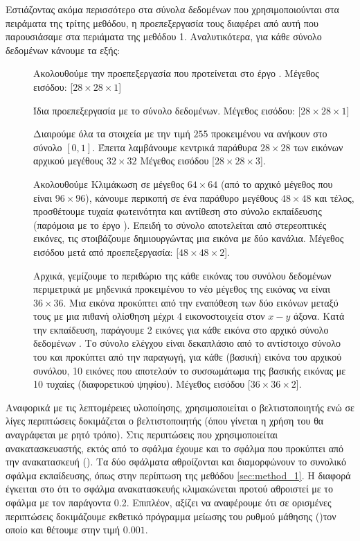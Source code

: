 Εστιάζοντας ακόμα περισσότερο στα σύνολα δεδομένων που χρησιμοποιούνται στα πειράματα της τρίτης μεθόδου, η προεπεξεργασία τους διαφέρει από αυτή που παρουσιάσαμε στα περιάματα της μεθόδου 1. Αναλυτικότερα, για κάθε σύνολο δεδομένων κάνουμε τα εξής:
\begin{description}
    \item[] Ακολουθούμε την προεπεξεργασία που προτείνεται στο έργο \cite{byerly2020branching}. Μέγεθος εισόδου: [$28 \times 28 \times 1$]
    \item[] Ίδια προεπεξεργασία με το σύνολο δεδομένων. Μέγεθος εισόδου: [$28 \times 28 \times 1$]
    \item[] Διαιρούμε όλα τα στοιχεία με την τιμή $255$ προκειμένου να ανήκουν στο σύνολο $[0,1]$. Έπειτα λαμβάνουμε κεντρικά παράθυρα $28 \times 28$ των εικόνων αρχικού μεγέθους $32 \times 32$ Μέγεθος εισόδου [$28 \times 28 \times 3$].
    \item[] Ακολουθούμε Κλιμάκωση σε μέγεθος $64 \times 64$ (από το αρχικό μέγεθος που είναι $96 \times 96$), κάνουμε περικοπή σε ένα παράθυρο μεγέθους $48 \times 48$ και τέλος, προσθέτουμε τυχαία φωτεινότητα και αντίθεση στο σύνολο εκπαίδευσης (παρόμοια με το έργο \cite{hinton2018matrix}). Επειδή το σύνολο αποτελείται από στερεοπτικές εικόνες, τις στοιβάζουμε δημιουργώντας μια εικόνα με δύο κανάλια. Μέγεθος εισόδου μετά από προεπεξεργασία: [$48 \times 48 \times 2$].
    \item[] Αρχικά, γεμίζουμε το περιθώριο της κάθε εικόνας του συνόλου δεδομένων  περιμετρικά με μηδενικά προκειμένου το νέο μέγεθος της εικόνας να είναι $36 \times 36$. Μια εικόνα  προκύπτει από την εναπόθεση των δύο εικόνων μεταξύ τους με μια πιθανή ολίσθηση μέχρι 4 εικονοστοιχεία στον $x-y$ άξονα. Κατά την εκπαίδευση, παράγουμε 2  εικόνες για κάθε εικόνα στο αρχικό σύνολο δεδομένων . Το σύνολο ελέγχου είναι δεκαπλάσιο από το αντίστοιχο σύνολο του  και προκύπτει από την παραγωγή, για κάθε (βασική) εικόνα του αρχικού συνόλου, 10 εικόνες που αποτελούν το συσσωμάτωμα της βασικής εικόνας με 10 τυχαίες (διαφορετικού ψηφίου). Μέγεθος εισόδου [$36 \times 36 \times 2$].
\end{description} 

Αναφορικά με τις λεπτομέρειες υλοποίησης, χρησιμοποιείται ο βελτιστοποιητής  ενώ σε λίγες περιπτώσεις δοκιμάζεται ο βελτιστοποιητής  (όπου γίνεται η χρήση του θα αναγράφεται με ρητό τρόπο). Στις περιπτώσεις που χρησιμοποιείται ανακατασκευαστής, εκτός από το σφάλμα  έχουμε και το σφάλμα που προκύπτει από την ανακατασκευή (). Τα δύο σφάλματα αθροίζονται και διαμορφώνουν το συνολικό σφάλμα εκπαίδευσης, όπως στην περίπτωση της μεθόδου \ref{sec:method_1}. Η διαφορά έγκειται στο ότι το σφάλμα ανακατασκευής κλιμακώνεται προτού αθροιστεί με το σφάλμα  με τον παράγοντα 0.2. Επιπλέον, αξίζει να αναφέρουμε ότι σε ορισμένες περιπτώσεις δοκιμάζουμε εκθετικό πρόγραμμα μείωσης του ρυθμού μάθησης ()τον οποίο και θέτουμε στην τιμή $0.001$.\par

